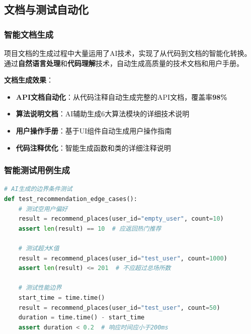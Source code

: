 \documentclass[12pt,a4paper]{article}
\begin{document}
\subsection{文档与测试自动化}

\subsubsection{智能文档生成}

\begin{infobox}[title={文档自动化创新}]
项目文档的生成过程中大量运用了AI技术，实现了从代码到文档的智能化转换。通过\textcolor{primary}{\textbf{自然语言处理}}和\textcolor{secondary}{\textbf{代码理解}}技术，自动生成高质量的技术文档和用户手册。
\end{infobox}

\textbf{文档生成效果}：
\begin{itemize}
    \item \textbf{API文档自动化}：从代码注释自动生成完整的API文档，覆盖率\textcolor{success}{\textbf{98\%}}
    \item \textbf{算法说明文档}：AI辅助生成6大算法模块的详细技术说明
    \item \textbf{用户操作手册}：基于UI组件自动生成用户操作指南
    \item \textbf{代码注释优化}：智能生成函数和类的详细注释说明
\end{itemize}

\subsubsection{智能测试用例生成}

\begin{tcolorbox}[
    colback=light,
    colframe=dark,
    title={\textbf{AI生成测试用例示例}},
    coltitle=white,
    colbacktitle=dark,
    fonttitle=\bfseries,
    rounded corners=3pt
]
\begin{lstlisting}[language=Python, caption={智能生成的推荐系统测试用例}]
# AI生成的边界条件测试
def test_recommendation_edge_cases():
    # 测试空用户偏好
    result = recommend_places(user_id="empty_user", count=10)
    assert len(result) == 10  # 应返回热门推荐
    
    # 测试超大K值
    result = recommend_places(user_id="test_user", count=1000)
    assert len(result) <= 201  # 不应超过总场所数
    
    # 测试性能边界
    start_time = time.time()
    result = recommend_places(user_id="test_user", count=50)
    duration = time.time() - start_time
    assert duration < 0.2  # 响应时间应小于200ms
\end{lstlisting}
\end{tcolorbox}
\end{document}
